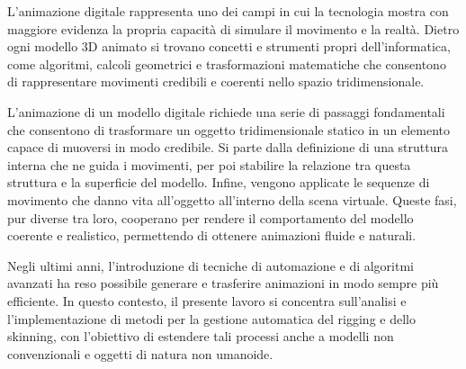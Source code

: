 L’animazione digitale rappresenta uno dei campi in cui la tecnologia mostra con maggiore evidenza la propria capacità di simulare il movimento e la realtà. Dietro ogni modello 3D animato si trovano concetti e strumenti propri dell’informatica, come algoritmi, calcoli geometrici e trasformazioni matematiche che consentono di rappresentare movimenti credibili e coerenti nello spazio tridimensionale.

L’animazione di un modello digitale richiede una serie di passaggi fondamentali che consentono di trasformare un oggetto tridimensionale statico in un elemento capace di muoversi in modo credibile. Si parte dalla definizione di una struttura interna che ne guida i movimenti, per poi stabilire la relazione tra questa struttura e la superficie del modello. Infine, vengono applicate le sequenze di movimento che danno vita all’oggetto all’interno della scena virtuale. Queste fasi, pur diverse tra loro, cooperano per rendere il comportamento del modello coerente e realistico, permettendo di ottenere animazioni fluide e naturali.

Negli ultimi anni, l’introduzione di tecniche di automazione e di algoritmi avanzati ha reso possibile generare e trasferire animazioni in modo sempre più efficiente. In questo contesto, il presente lavoro si concentra sull’analisi e l’implementazione di metodi per la gestione automatica del rigging e dello skinning, con l’obiettivo di estendere tali processi anche a modelli non convenzionali e oggetti di natura non umanoide.

